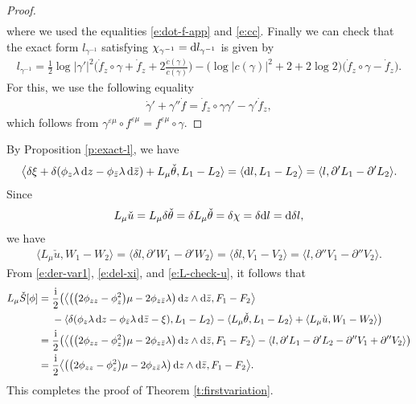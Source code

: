 \documentclass[10pt,a4paper]{amsart}
\numberwithin{equation}{section}
\newcommand{\pa}{\partial}
\newcommand{\vep}{\varepsilon}
\begin{document}
\begin{proof}
\begin{align*}
\end{align*}
where we used the equalities \eqref{e:dot-f-app} and \eqref{e:cc}.
Finally we can check that the exact form $l_{\gamma^{-1}}$ satisfying $\chi_{\gamma^{-1}}= {\rm d}l_{\gamma^{-1}}$
is given by
\begin{gather*}
l_{\gamma^{-1}}=\frac{1}{2}\log|\gamma'|^2\bigg(\dot{f}_z\circ\gamma +\dot{f}_z+2\frac{\dot{c}(\gamma)}{c(\gamma)}\bigg)
-\big(\log|c(\gamma)|^2+2+2\log 2\big)\big(\dot{f}_z\circ\gamma-\dot{f}_z\big).
\end{gather*}
For this, we use the following equality
\begin{gather*}
\dot{\gamma}' +\gamma'' \dot{f} = \dot{f}_z\circ \gamma \gamma' -\gamma' \dot{f}_z,
\end{gather*}
which follows from $\gamma^{\vep\mu}\circ f^{\vep\mu}= f^{\vep\mu} \circ \gamma$.
\end{proof}


By Proposition \ref{p:exact-l}, we have
\begin{gather}\label{e:del-xi}
\big\langle \delta\xi+\delta(\phi_z \lambda \,{\rm d}z - \phi_{\bar{z}} \lambda\, {\rm d}\bar{z}) +L_{\mu}\check{\theta}, L_1-L_2 \rangle =\langle {\rm d}l, L_1-L_2\big\rangle
=\langle l, \pa'L_1- \pa'L_2 \rangle.
\end{gather}
Since
\begin{gather*}
L_{\mu}\check{u}=L_{\mu}\delta \check{\theta}=\delta L_{\mu}\check{\theta}
=\delta \chi=\delta {\rm d}l={\rm d}\delta l,
\end{gather*}
we have
\begin{gather}\label{e:L-check-u}
\langle L_{\mu}\check{u}, W_1-W_2\rangle
=\langle\delta l, \pa'W_1-\pa'W_2\rangle
=\langle\delta l, V_1-V_2 \rangle
=\langle l, \pa''V_1-\pa''V_2 \rangle.
\end{gather}
From \eqref{e:der-var1}, \eqref{e:del-xi}, and \eqref{e:L-check-u}, it follows that
\begin{align*}
L_{\mu}\check{S}[\phi]
={}&\frac{\rm i}{2}\bigl(\big\langle \big(\big(2\phi_{zz}-\phi^2_z\big)\mu -2\phi_{z\bar{z}} \lambda\big)\, {\rm d}z\wedge {\rm d}\bar{z}, F_1-F_2 \big\rangle
\\
& -\langle \delta(\phi_z \lambda \,{\rm d}z - \phi_{\bar{z}} \lambda\, {\rm d}\bar{z} - \xi), L_1-L_2 \rangle -\langle L_{\mu}\check{\theta}, L_1-L_2 \rangle+\langle L_{\mu}\check{u}, W_1-W_2 \rangle\bigr)
\\
={}& \frac{\rm i}{2}\bigl(\big\langle \big(\big(2\phi_{zz}-\phi^2_z\big)\mu -2\phi_{z\bar{z}} \lambda \big)\, {\rm d}z\wedge {\rm d}\bar{z}, F_1-F_2 \big\rangle-\langle l, \pa'L_1-\pa'L_2-\pa''V_1+\pa''V_2 \rangle\bigr)
\\
={}&\frac{\rm i}{2}\big\langle \big(\big(2\phi_{zz}-\phi^2_z\big)\mu -2\phi_{z\bar{z}} \lambda \big)\, {\rm d}z\wedge {\rm d}\bar{z}, F_1-F_2 \big\rangle.
\end{align*}
This completes the proof of Theorem \ref{t:firstvariation}.
\end{document}
